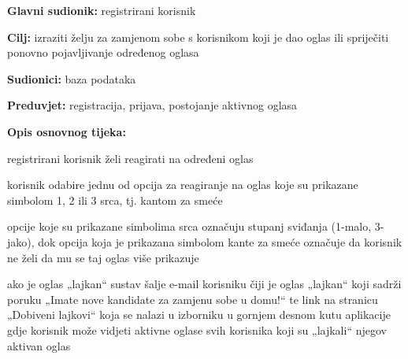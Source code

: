 \noindent {}
\begin{packed_item}
	
	\item \textbf{Glavni sudionik: } registrirani korisnik
	\item  \textbf{Cilj:}  izraziti želju za zamjenom sobe s korisnikom koji je dao oglas ili spriječiti ponovno pojavljivanje određenog oglasa
	\item  \textbf{Sudionici:} baza podataka
	\item  \textbf{Preduvjet:} registracija, prijava, postojanje aktivnog oglasa
	\item  \textbf{Opis osnovnog tijeka:}
	
	\item[] \begin{packed_enum}
		
		\item registrirani korisnik želi reagirati na određeni oglas
		\item korisnik odabire jednu od opcija za reagiranje na oglas koje su prikazane simbolom 1, 2 ili 3 srca, tj. kantom za smeće
		\item opcije koje su prikazane simbolima srca označuju stupanj sviđanja (1-malo, 3-jako), dok opcija koja je prikazana simbolom kante za smeće označuje da korisnik ne želi da mu se taj oglas više prikazuje
		\item ako je oglas „lajkan“ sustav šalje e-mail korisniku čiji je oglas „lajkan“ koji sadrži poruku „Imate nove kandidate za zamjenu sobe u domu!“ te link na stranicu „Dobiveni lajkovi“ koja se nalazi u izborniku u gornjem desnom kutu aplikacije gdje korisnik može vidjeti aktivne oglase svih korisnika koji su „lajkali“ njegov aktivan oglas
			
	\end{packed_enum}

\end{packed_item}

	

